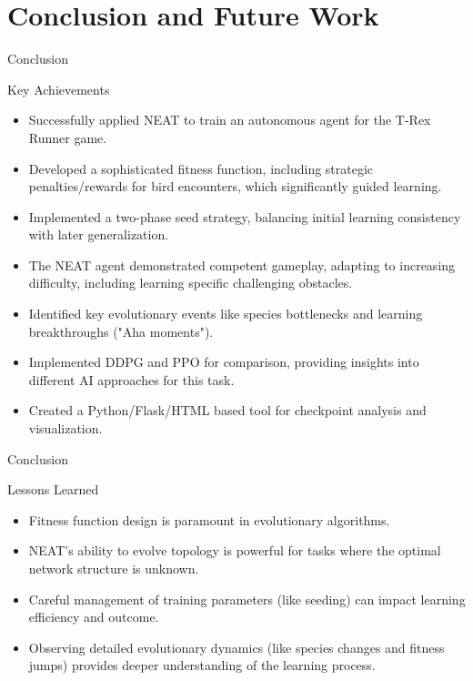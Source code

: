 \documentclass{beamer}
\begin{document}
\section{Conclusion and Future Work}

\begin{frame}{Conclusion}
  \begin{block}{Key Achievements}
    \begin{itemize}
        \item Successfully applied NEAT to train an autonomous agent for the T-Rex Runner game.
        \item Developed a sophisticated fitness function, including strategic penalties/rewards for bird encounters, which significantly guided learning.
        \item Implemented a two-phase seed strategy, balancing initial learning consistency with later generalization.
        \item The NEAT agent demonstrated competent gameplay, adapting to increasing difficulty, including learning specific challenging obstacles.
        \item Identified key evolutionary events like species bottlenecks and learning breakthroughs ("Aha moments").
        \item Implemented DDPG and PPO for comparison, providing insights into different AI approaches for this task.
        \item Created a Python/Flask/HTML based tool for checkpoint analysis and visualization.
    \end{itemize}
  \end{block}
\end{frame}

\begin{frame}{Conclusion}
  \begin{block}{Lessons Learned}
    \begin{itemize}
        \item Fitness function design is paramount in evolutionary algorithms.
        \item NEAT's ability to evolve topology is powerful for tasks where the optimal network structure is unknown.
        \item Careful management of training parameters (like seeding) can impact learning efficiency and outcome.
        \item Observing detailed evolutionary dynamics (like species changes and fitness jumps) provides deeper understanding of the learning process.
    \end{itemize}
  \end{block}
\end{frame}
\end{document}
